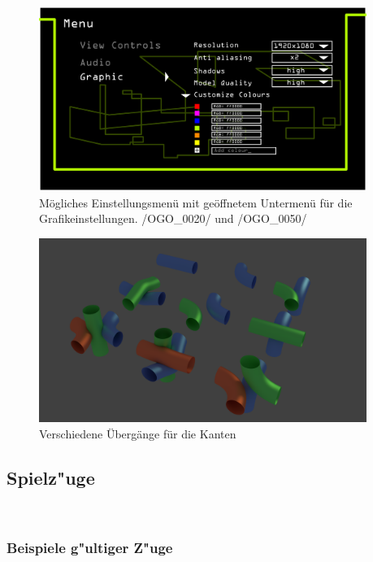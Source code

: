 	\begin{figure}[ht]
	  \centering
	  \includegraphics[width = 0.95\textwidth]{Inhalt/Nutzung/Grafiken/Grafische_Oberflaechen/08_Knot3-menu-graphics.png}
	  \caption{Mögliches Einstellungsmenü mit geöffnetem Untermenü für die Grafikeinstellungen. /OGO\_0020/ und /OGO\_0050/}
	  \label{fig:setGFX}
	\end{figure}
	
	\begin{figure}[ht]
	  \centering
	  \includegraphics[width = 0.95\textwidth]{Inhalt/Nutzung/Grafiken/Grafische_Oberflaechen/Pipes2.png}
	  \caption{Verschiedene Übergänge für die Kanten}
	  \label{fig:pipes2}
	\end{figure}
	

\clearpage
	


\subsection{Spielz{"u}ge}~\\


\subsubsection{Beispiele g{"u}ltiger Z{"u}ge}


